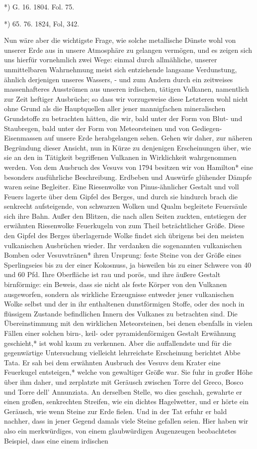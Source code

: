 \documentclass[a4paper, 11pt, oneside, polutonikogreek, german]{article}
\begin{document}
*) G. 16. 1804. Fol. 75.

*) 65. 76. 1824, Fol, 342.

Nun wäre aber die wichtigste Frage, wie solche metallische Dünste wohl von unserer Erde aus in unsere Atmosphäre zu gelangen vermögen, und es zeigen sich uns hierfür vornehmlich zwei Wege: einmal durch allmähliche, unserer unmittelbaren Wahrnehmung meist sich entziehende langsame Verdunstung, ähnlich derjenigen unseres Wassers, - und zum Andern durch ein zeitweises massenhafteres Ausströmen aus unseren irdischen, tätigen Vulkanen, namentlich zur Zeit heftiger Ausbrüche; so dass wir vorzugsweise diese Letzteren wohl nicht ohne Grund als die Hauptquellen aller jener mannigfachen mineralischen Grundstoffe zu betrachten hätten, die wir, bald unter der Form von Blut- und Staubregen, bald unter der Form von Meteorsteinen und von Gediegen-Eisenmassen auf unsere Erde herabgelangen sehen. Gehen wir daher, zur näheren Begründung dieser Ansicht, nun in Kürze zu denjenigen Erscheinungen über, wie sie an den in Tätigkeit begriffenen Vulkanen in Wirklichkeit wahrgenommen werden. Von dem Ausbruch des Vesuvs von 1794 besitzen wir von Hamilton* eine besonders ausführliche Beschreibung. Erdbeben und Auswürfe glühender Dämpfe waren seine Begleiter. Eine Riesenwolke von Pinus-ähnlicher Gestalt und voll Feuers lagerte über dem Gipfel des Berges, und durch sie hindurch brach die senkrecht aufsteigende, von schwarzen Wolken und Qualm begleitete Feuersäule sich ihre Bahn. Außer den Blitzen, die nach allen Seiten zuckten, entstiegen der erwähnten Riesenwolke Feuerkugeln von zum Theil beträchtlicher Größe. Diese den Gipfel des Berges überlagernde Wolke findet sich übrigens bei den meisten vulkanischen Ausbrüchen wieder. Ihr verdanken die sogenannten vulkanischen Bomben oder Vesuvstränen* ihren Ursprung: feste Steine von der Größe eines Sperlingseies bis zu der einer Kokosnuss, ja bisweilen bis zu einer Schwere von 40 und 60 Pfd. Ihre Oberfläche ist rau und porös, und ihre äußere Gestalt birnförmige: ein Beweis, dass sie nicht als feste Körper von den Vulkanen ausgeworfen, sondern als wirkliche Erzeugnisse entweder jener vulkanischen Wolke selbst und der in ihr enthaltenen dunstförmigen Stoffe, oder des noch in flüssigem Zustande befindlichen Innern des Vulkanes zu betrachten sind. Die Übereinstimmung mit den wirklichen Meteorsteinen, bei denen ebenfalls in vielen Fällen einer solchen birn-, keil- oder pyramidenförmigen Gestalt Erwähnung geschieht,* ist wohl kaum zu verkennen. Aber die auffallendste und für die gegenwärtige Untersuchung vielleicht lehrreichste Erscheinung berichtet Abbe Tata. Er sah bei dem erwähnten Ausbruch des Vesuvs dem Krater eine Feuerkugel entsteigen,* welche von gewaltiger Größe war. Sie fuhr in großer Höhe über ihm daher, und zerplatzte mit Geräusch zwischen Torre del Greco, Bosco und Torre dell' Annunziata. An derselben Stelle, wo dies geschah, gewahrte er einen großen, senkrechten Streifen, wie ein dichtes Hagelwetter, und er hörte ein Geräusch, wie wenn Steine zur Erde fielen. Und in der Tat erfuhr er bald nachher, dass in jener Gegend damals viele Steine gefallen seien. Hier haben wir also ein merkwürdiges, von einem glaubwürdigen Augenzeugen beobachtetes Beispiel, dass eine einem irdischen 
\end{document}
